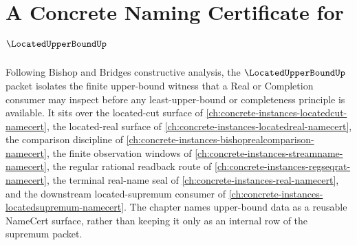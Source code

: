 \chapter{A Concrete Naming Certificate for $\LocatedUpperBoundUp$}
\label{ch:concrete-instances-located-upper-bound-namecert}

Following Bishop and Bridges constructive analysis, the $\LocatedUpperBoundUp$ packet isolates the finite upper-bound witness that a Real or Completion consumer may inspect before any least-upper-bound or completeness principle is available. It sits over the located-cut surface of \autoref{ch:concrete-instances-locatedcut-namecert}, the located-real surface of \autoref{ch:concrete-instances-locatedreal-namecert}, the comparison discipline of \autoref{ch:concrete-instances-bishoprealcomparison-namecert}, the finite observation windows of \autoref{ch:concrete-instances-streamname-namecert}, the regular rational readback route of \autoref{ch:concrete-instances-regseqrat-namecert}, the terminal real-name seal of \autoref{ch:concrete-instances-real-namecert}, and the downstream located-supremum consumer of \autoref{ch:concrete-instances-locatedsupremum-namecert}. The chapter names upper-bound data as a reusable NameCert surface, rather than keeping it only as an internal row of the supremum packet.


